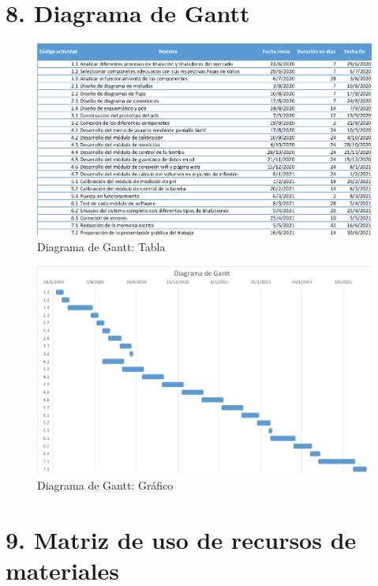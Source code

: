 \documentclass[11pt]{charter}
\begin{document}
\section{8. Diagrama de Gantt}
\label{sec:gantt}


\begin{figure}[p]
\centering 
\includegraphics[width=1\textwidth]{./Figuras/TablaGantt.png}
\caption{Diagrama de Gantt: Tabla}
\label{fig:tablaGantt}
\end{figure}

\begin{figure}[p]

\centering 
\includegraphics[width=1\textwidth]{./Figuras/DiagramaGantt.png}
\caption{Diagrama de Gantt: Gráfico}
\label{fig:diagramaGantt}
\end{figure}

\section{9. Matriz de uso de recursos de materiales}
\label{sec:recursos}
\end{document}
